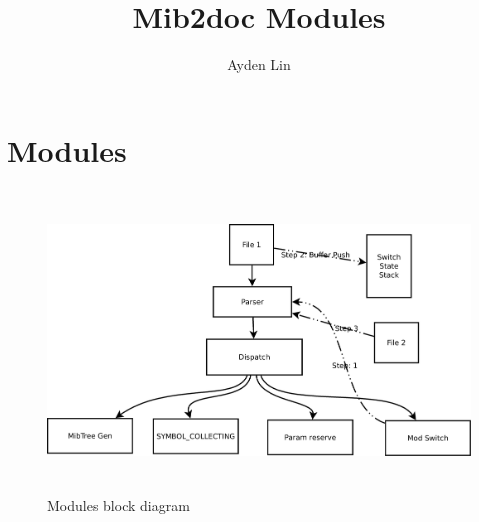 \documentclass[10pt]{article}
\author{Ayden Lin}
\title{Mib2doc Modules}
\begin{document}
	\maketitle
	\newpage
	\section{Modules}
	\begin{figure}[htbp]
		\centering
		\includegraphics[height=8cm]{image/modules.png}
		\caption{Modules block diagram}
	\end{figure}
\end{document}
